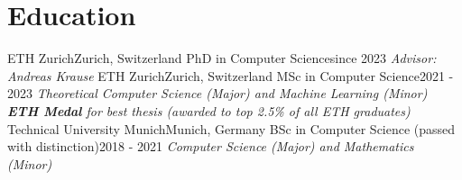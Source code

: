 \documentclass[a4paper,20pt]{article}
\begin{document}


\vspace{-5pt}
\section{Education}
  \resumeSubHeadingListStart
    \resumeSubheading
      {ETH Zurich}{Zurich, Switzerland}
      {PhD in Computer Science}{since 2023}
      {\scriptsize \textit{ \footnotesize{\newline Advisor: Andreas Krause}}}
    \resumeSubHeadingListEnd
  \vspace{-5pt}
    \resumeSubHeadingListStart
      \resumeSubheading
        {ETH Zurich}{Zurich, Switzerland}
        {MSc in Computer Science}{2021 - 2023}
        {\scriptsize \textit{ \footnotesize{\newline{}Theoretical Computer Science (Major) and Machine Learning (Minor)}
        \newline \textbf{ETH Medal} for best thesis (awarded to top 2.5\% of all ETH graduates)}}
      \resumeSubHeadingListEnd
  \vspace{-5pt}
    \resumeSubHeadingListStart
      \resumeSubheading
        {Technical University Munich}{Munich, Germany}
        {BSc in Computer Science (passed with distinction)}{2018 - 2021}
        {\scriptsize \textit{ \footnotesize{\newline{}Computer Science (Major) and Mathematics (Minor)}}}
      \resumeSubHeadingListEnd

\vspace{-5pt}
\end{document}
